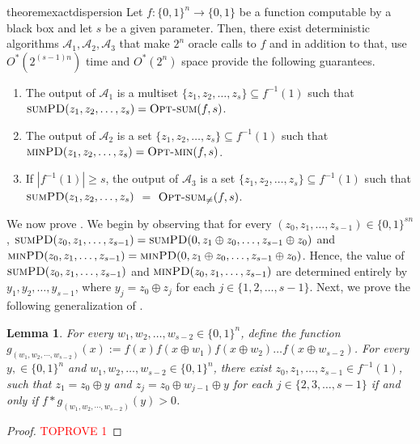 \documentclass[11pt, letterpaper]{article}
\newtheorem{lemma}[theorem]{Lemma}
\theoremstyle{definition}
\newcommand{\Q}[1]{\{0,1\}^{#1}}
\newcommand{\PD}{\textsc{minPD}}
\newcommand{\SPD}{\textsc{sumPD}}
\newcommand{\opts}{\textsc{Opt-sum}}
\newcommand{\optm}{\textsc{Opt-min}}
\begin{document}
\begin{restatable}{theorem}{exactdispersion}\label{thm:exactdisp}
	Let $f: \Q{n} \to \{0,1\}$ be a function computable by a black box and let $s$ be a given parameter. Then, there exist deterministic algorithms $\mathcal{A}_1, \mathcal{A}_2, \mathcal{A}_3$ that make $2^n$ oracle calls to $f$ and in addition to that, use $O^*(2^{(s-1)n})$ time and $O^*(2^n)$ space provide the following guarantees.
 \sloppy
 \begin{enumerate}
     \item The output of $\mathcal{A}_1$ is a multiset $\{z_1, z_2, \dots, z_s\} \subseteq f^{-1}(1)$ such that $\SPD(z_1, z_2, \dots, z_s) = \opts(f,s)$. 
     \item The output of $\mathcal{A}_2$ is a set $\{z_1, z_2, \dots, z_s \} \subseteq f^{-1}(1)$ such that $\PD(z_1, z_2, \dots, z_s) = \optm(f,s)$. 
     \item If $|f^{-1}(1)| \geq s$, the output of $\mathcal{A}_3$ is a set $\{z_1, z_2, \dots, z_s \} \subseteq f^{-1}(1)$ such that $\SPD(z_1, z_2, \dots, z_s)$ $ =$ $\opts_{\neq}(f,s)$. 
 \end{enumerate}
\end{restatable}

We now prove . We begin by observing that for every $(z_0, z_1, \dots, z_{s-1}) \in \Q{sn}$, $\SPD(z_0, z_1, \dots, z_{s-1})=\SPD(0, z_1 \oplus z_0, \dots, z_{s-1} \oplus z_0)$ and $\PD(z_0, z_1, \dots, z_{s-1})=\PD(0, z_1 \oplus z_0, \dots, z_{s-1} \oplus z_0)$. Hence, the value of $\SPD(z_0, z_1, \dots, z_{s-1})$ and $\PD(z_0, z_1, \dots, z_{s-1})$ are determined entirely by $y_1, y_2, \dots, y_{s-1}$, where $y_j=z_0 \oplus z_j$ for each $j \in \{1,2,\dots, s-1\}$. Next, we prove the following generalization of . 

\begin{lemma} \label{lem:convolutiondiversity}
    For every $w_1, w_2, \dots, w_{s-2} \in \Q{n}$, define the function $g_{(w_1, w_2, \cdots, w_{s-2})}(x):=f(x) f(x \oplus w_1) f(x \oplus w_2) \dots f(x \oplus w_{s-2})$. For every $y, \in \Q{n}$ and $w_1, w_2, \dots, w_{s-2} \in \Q{n}$, there exist $z_0, z_1, \dots, z_{s-1} \in f^{-1}(1)$, such that $z_1=z_0 \oplus y$ and $z_j=z_0 \oplus w_{j-1} \oplus y$ for each $j \in \{2,3, \dots, s-1\}$ if and only if $f*g_{(w_1, w_2, \cdots, w_{s-2})}(y) >0$.
\end{lemma}
\begin{proof}\textcolor{red}{TOPROVE 1}\end{proof}
\end{document}

